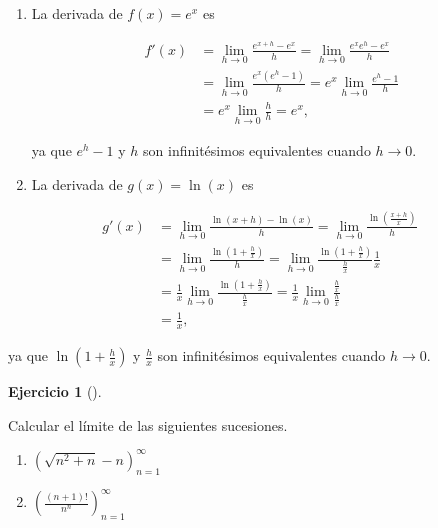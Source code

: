 \documentclass[
  spanish,
  a4paper,
]{scrreport}
\providecommand{\tightlist}{%
  \setlength{\itemsep}{0pt}\setlength{\parskip}{0pt}}
\theoremstyle{definition}
\newtheorem{exercise}{Ejercicio}[chapter]
\theoremstyle{remark}
\begin{document}
\begin{tcolorbox}[enhanced jigsaw, arc=.35mm, bottomrule=.15mm, bottomtitle=1mm, breakable, colback=white, colbacktitle=quarto-callout-tip-color!10!white, colframe=quarto-callout-tip-color-frame, coltitle=black, left=2mm, leftrule=.75mm, opacityback=0, opacitybacktitle=0.6, rightrule=.15mm, title=\textcolor{quarto-callout-tip-color}{\faLightbulb}\hspace{0.5em}{Solución}, titlerule=0mm, toprule=.15mm, toptitle=1mm]

\begin{enumerate}
\def\labelenumi{\alph{enumi}.}
\item
  La derivada de \(f(x)=e^x\) es

  \begin{align*}
  f'(x) 
  &= \lim_{h\to 0}\frac{e^{x+h}-e^x}{h} 
  = \lim_{h\to 0}\frac{e^x e^h-e^x}{h}\\
  & = \lim_{h\to 0}\frac{e^x(e^h-1)}{h} 
  = e^x\lim_{h\to 0}\frac{e^h-1}{h} \\
  & = e^x\lim_{h\to 0}\frac{h}{h} 
  = e^x,
  \end{align*}

  ya que \(e^h-1\) y \(h\) son infinitésimos equivalentes cuando
  \(h\to 0\).
\item
  La derivada de \(g(x) = \ln(x)\) es
\end{enumerate}

\begin{align*}
g'(x) 
&= \lim_{h\to 0}\frac{\ln(x+h)-\ln(x)}{h}
= \lim_{h\to 0}\frac{\ln\left(\frac{x+h}{x}\right)}{h}\\
&= \lim_{h\to 0}\frac{\ln\left(1+\frac{h}{x}\right)}{h}
= \lim_{h\to 0}\frac{\ln\left(1+\frac{h}{x}\right)}{\frac{h}{x}}\frac{1}{x}\\
&= \frac{1}{x}\lim_{h\to 0}\frac{\ln\left(1+\frac{h}{x}\right)}{\frac{h}{x}}
= \frac{1}{x}\lim_{h\to 0}\frac{\frac{h}{x}}{\frac{h}{x}}\\
&= \frac{1}{x},
\end{align*}

ya que \(\ln\left(1+\frac{h}{x}\right)\) y \(\frac{h}{x}\) son
infinitésimos equivalentes cuando \(h\to 0\).

\end{tcolorbox}

\begin{exercise}[]\protect\hypertarget{exr-3}{}\label{exr-3}

Calcular el límite de las siguientes sucesiones.

\begin{enumerate}
\def\labelenumi{\alph{enumi}.}
\tightlist
\item
  \(\left(\sqrt{n^2+n}-n\right)_{n=1}^\infty\)
\item
  \(\left(\frac{(n+1)!}{n^n}\right)_{n=1}^\infty\)
\end{enumerate}

\end{exercise}
\end{document}

